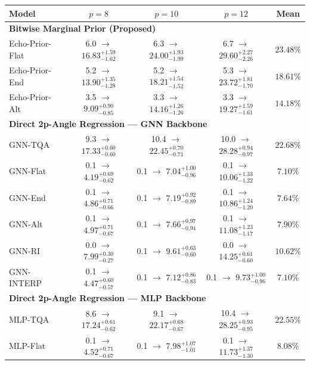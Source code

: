 \begin{tabular}{lcccc}
\toprule
Model & $p=8$ & $p=10$ & $p=12$ & Mean \\ \midrule
\multicolumn{5}{l}{\textbf{Bitwise Marginal Prior (Proposed)}} \\ \midrule
Echo-Prior-Flat & 6.0 $\rightarrow$ $16.83^{+1.59}_{-1.62}$ & 6.3 $\rightarrow$ $\mathbf{24.00}^{+1.93}_{-1.99}$ & 6.7 $\rightarrow$ $\mathbf{29.60}^{+2.27}_{-2.26}$ & $\mathbf{23.48}\%$ \\
Echo-Prior-End & 5.2 $\rightarrow$ $13.90^{+1.35}_{-1.28}$ & 5.2 $\rightarrow$ $18.21^{+1.54}_{-1.52}$ & 5.3 $\rightarrow$ $23.72^{+1.81}_{-1.70}$ & $18.61\%$ \\
Echo-Prior-Alt & 3.5 $\rightarrow$ $9.09^{+0.90}_{-0.85}$ & 3.3 $\rightarrow$ $14.16^{+1.26}_{-1.26}$ & 3.3 $\rightarrow$ $19.27^{+1.59}_{-1.61}$ & $14.18\%$ \\
\multicolumn{5}{l}{\textbf{Direct 2p-Angle Regression — GNN Backbone}} \\ \midrule
GNN-TQA & 9.3 $\rightarrow$ $\mathbf{17.33}^{+0.60}_{-0.60}$ & 10.4 $\rightarrow$ $22.45^{+0.70}_{-0.71}$ & 10.0 $\rightarrow$ $28.28^{+0.94}_{-0.97}$ & $22.68\%$ \\
GNN-Flat & 0.1 $\rightarrow$ $4.19^{+0.69}_{-0.62}$ & 0.1 $\rightarrow$ $7.04^{+1.00}_{-0.96}$ & 0.1 $\rightarrow$ $10.06^{+1.33}_{-1.22}$ & $7.10\%$ \\
GNN-End & 0.1 $\rightarrow$ $4.86^{+0.71}_{-0.66}$ & 0.1 $\rightarrow$ $7.19^{+0.92}_{-0.89}$ & 0.1 $\rightarrow$ $10.86^{+1.24}_{-1.20}$ & $7.64\%$ \\
GNN-Alt & 0.1 $\rightarrow$ $4.97^{+0.71}_{-0.67}$ & 0.1 $\rightarrow$ $7.66^{+0.97}_{-0.94}$ & 0.1 $\rightarrow$ $11.08^{+1.23}_{-1.17}$ & $7.90\%$ \\
GNN-RI & 0.0 $\rightarrow$ $7.99^{+0.30}_{-0.27}$ & 0.1 $\rightarrow$ $9.61^{+0.63}_{-0.60}$ & 0.0 $\rightarrow$ $14.25^{+0.61}_{-0.60}$ & $10.62\%$ \\
GNN-INTERP & 0.1 $\rightarrow$ $4.47^{+0.60}_{-0.57}$ & 0.1 $\rightarrow$ $7.12^{+0.86}_{-0.83}$ & 0.1 $\rightarrow$ $9.73^{+1.00}_{-0.96}$ & $7.10\%$ \\
\multicolumn{5}{l}{\textbf{Direct 2p-Angle Regression — MLP Backbone}} \\ \midrule
MLP-TQA & 8.6 $\rightarrow$ $17.24^{+0.61}_{-0.62}$ & 9.1 $\rightarrow$ $22.17^{+0.68}_{-0.67}$ & 10.4 $\rightarrow$ $28.25^{+0.93}_{-0.95}$ & $22.55\%$ \\
MLP-Flat & 0.1 $\rightarrow$ $4.52^{+0.71}_{-0.67}$ & 0.1 $\rightarrow$ $7.98^{+1.07}_{-1.01}$ & 0.1 $\rightarrow$ $11.73^{+1.37}_{-1.30}$ & $8.08\%$ \\

\end{tabular}
